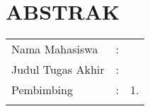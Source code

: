 \chapter*{ABSTRAK}

\vspace{2ex}

\begingroup
\setlength{\tabcolsep}{0pt}

\noindent
\begin{tabularx}{\textwidth}{l >{\centering}m{2em} X}
  Nama Mahasiswa    & : & \name{}         \\

  Judul Tugas Akhir & : & \tatitle{}      \\

  Pembimbing        & : & 1. \advisor{}   \\
  \\
\end{tabularx}
\endgroup



